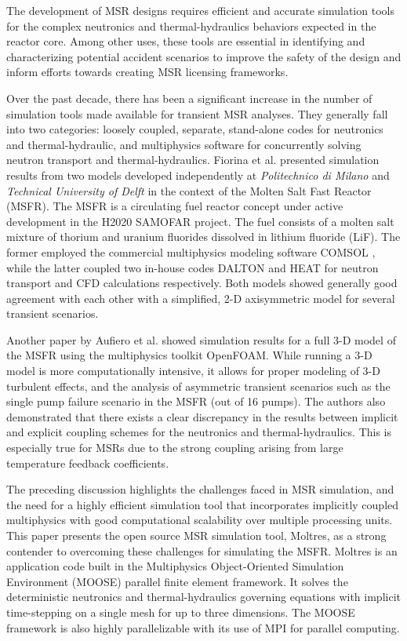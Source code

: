 The development of MSR designs requires efficient and accurate simulation tools
for the complex neutronics and thermal-hydraulics behaviors expected in the
reactor core. Among other uses, these tools are essential in identifying and
characterizing potential accident scenarios to improve the safety of the design
and inform efforts towards creating MSR licensing frameworks.

Over the past decade, there has been a significant increase in the number of
simulation tools made available for transient MSR analyses. They generally fall
into two categories: loosely coupled, separate, stand-alone codes for
neutronics and thermal-hydraulic, and multiphysics software for concurrently
solving neutron transport and thermal-hydraulics. Fiorina et al.
\cite{fiorina_modelling_2014} presented simulation results from two
models developed independently at \textit{Politechnico di Milano} and
\textit{Technical University of Delft} in the context of the Molten Salt Fast
Reactor (MSFR). The MSFR is a circulating fuel reactor concept under active
development in the H2020 SAMOFAR project. The fuel consists of a molten salt
mixture of thorium and uranium fluorides dissolved in lithium fluoride (LiF).
The former employed the commercial
multiphysics modeling software COMSOL \cite{comsol_ab_comsol_2018}, while the
latter coupled two in-house codes DALTON and HEAT for neutron transport and
CFD calculations respectively. Both models showed generally good agreement with
each other with a simplified, 2-D axisymmetric model for several transient
scenarios.

Another paper by Aufiero et al. showed simulation results for a full 3-D model
of the MSFR using the multiphysics toolkit OpenFOAM. While running a 3-D model
is more computationally intensive, it allows for proper modeling of 3-D
turbulent effects, and the analysis of asymmetric transient scenarios such as
the single pump failure scenario in the MSFR (out of 16
pumps). The authors also demonstrated that there exists a clear discrepancy in
the results between implicit and explicit coupling schemes for the neutronics
and thermal-hydraulics. This is especially true for MSRs due to the strong
coupling arising from large temperature feedback coefficients. 

The preceding discussion highlights the challenges faced in MSR simulation, and
the need for a highly efficient simulation tool that incorporates implicitly
coupled multiphysics with good computational scalability over multiple
processing units. This paper presents the open source MSR simulation tool,
Moltres, as a strong contender to overcoming these challenges for simulating
the MSFR. Moltres is an application code
built in the Multiphysics Object-Oriented Simulation Environment (MOOSE)
parallel finite element framework. It solves the deterministic neutronics and
thermal-hydraulics governing equations with implicit
time-stepping on a single mesh for up to three dimensions. The MOOSE framework
is also highly parallelizable with its use of MPI for parallel computing.

